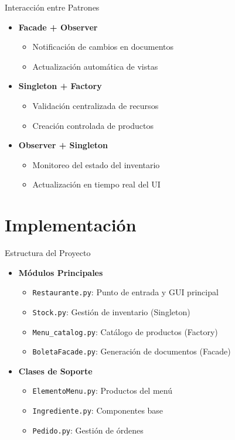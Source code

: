 \documentclass[12pt]{beamer}
\begin{document}
\begin{frame}{Interacción entre Patrones}
    \begin{itemize}
        \item \textbf{Facade + Observer}
        \begin{itemize}
            \item Notificación de cambios en documentos
            \item Actualización automática de vistas
        \end{itemize}
        \item \textbf{Singleton + Factory}
        \begin{itemize}
            \item Validación centralizada de recursos
            \item Creación controlada de productos
        \end{itemize}
        \item \textbf{Observer + Singleton}
        \begin{itemize}
            \item Monitoreo del estado del inventario
            \item Actualización en tiempo real del UI
        \end{itemize}
    \end{itemize}
\end{frame}

\section{Implementación}
\begin{frame}{Estructura del Proyecto}
    \begin{itemize}
        \item \textbf{Módulos Principales}
        \begin{itemize}
            \item \texttt{Restaurante.py}: Punto de entrada y GUI principal
            \item \texttt{Stock.py}: Gestión de inventario (Singleton)
            \item \texttt{Menu\_catalog.py}: Catálogo de productos (Factory)
            \item \texttt{BoletaFacade.py}: Generación de documentos (Facade)
        \end{itemize}
        \item \textbf{Clases de Soporte}
        \begin{itemize}
            \item \texttt{ElementoMenu.py}: Productos del menú
            \item \texttt{Ingrediente.py}: Componentes base
            \item \texttt{Pedido.py}: Gestión de órdenes
        \end{itemize}
    \end{itemize}
\end{frame}
\end{document}
